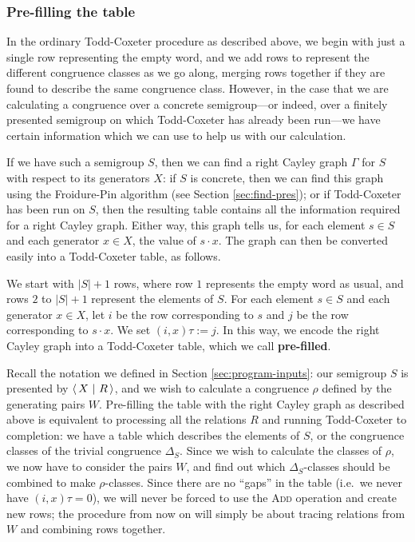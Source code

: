 \subsubsection{Pre-filling the table}
\label{sec:tc-prefill}
In the ordinary Todd-Coxeter procedure as described above, we begin with just a
single row representing the empty word, and we add rows to represent the
different congruence classes as we go along, merging rows together if they are
found to describe the same congruence class.  However, in the case that we are
calculating a congruence over a concrete semigroup---or indeed, over a finitely
presented semigroup on which Todd-Coxeter has already been run---we have certain
information which we can use to help us with our calculation.

If we have such a semigroup $S$, then we can find a right Cayley graph $\Gamma$
for $S$ with respect to its generators $X$: if $S$ is concrete, then we can find
this graph using the Froidure-Pin algorithm (see Section \ref{sec:find-pres});
or if Todd-Coxeter has been run on $S$, then the resulting table contains all
the information required for a right Cayley graph.  Either way, this graph tells us, for
each element $s \in S$ and each generator $x \in X$, the value of $s \cdot x$.
The graph can then be converted easily into a Todd-Coxeter table, as follows.

We start with $|S| + 1$
rows, where row $1$ represents the empty word as usual, and rows $2$ to $|S| + 1$
represent the elements of $S$.  For each element $s \in S$ and each generator
$x \in X$, let $i$ be the row corresponding to $s$ and $j$ be the row
corresponding to $s \cdot x$.  We set $(i, x)\tau := j$.  In this way, we encode
the right Cayley graph into a Todd-Coxeter table, which we call
\textbf{pre-filled}.

Recall the notation we defined in Section \ref{sec:program-inputs}: our
semigroup $S$ is presented by $\left\langle\,X ~\middle|~ R\,\right\rangle$, and we wish to calculate a congruence
$\rho$ defined by the generating pairs $W$.  Pre-filling the table with the
right Cayley graph as described above is equivalent to processing all the
relations $R$ and running Todd-Coxeter to completion: we have a table which
describes the elements of $S$, or the congruence classes of the trivial
congruence $\Delta_S$.  Since we wish to calculate the classes of $\rho$, we now
have to consider the pairs $W$, and find out which $\Delta_S$-classes should be
combined to make $\rho$-classes.  Since there are no ``gaps'' in the table (i.e.~we never have
$(i,x)\tau=0$), we will never be forced to use the \textsc{Add} operation and
create new rows; the procedure from now on will simply be about tracing
relations from $W$ and combining rows together.

